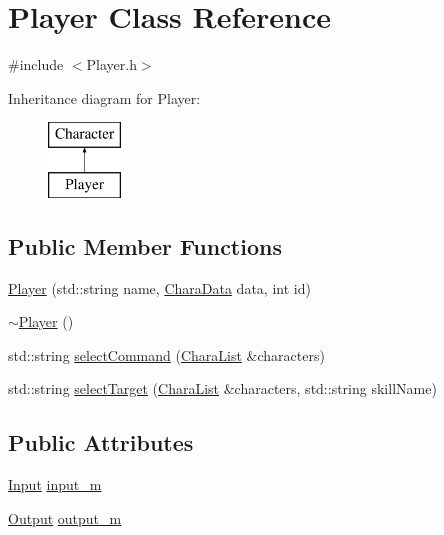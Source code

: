 \hypertarget{class_player}{}\section{Player Class Reference}
\label{class_player}


{\ttfamily \#include $<$Player.\+h$>$}

Inheritance diagram for Player\+:\begin{figure}[H]
\begin{center}
\leavevmode
\includegraphics[height=2.000000cm]{class_player}
\end{center}
\end{figure}
\subsection*{Public Member Functions}
\begin{DoxyCompactItemize}
\item 
\hyperlink{class_player_ac67c2c665f202dd5a8d69eb4b7c39901}{Player} (std\+::string name, \hyperlink{struct_chara_data}{Chara\+Data} data, int id)
\item 
\hyperlink{class_player_a749d2c00e1fe0f5c2746f7505a58c062}{$\sim$\+Player} ()
\item 
std\+::string \hyperlink{class_player_a2dbcfb38080a64dab3f9b721486ab38d}{select\+Command} (\hyperlink{_character_8h_ac22f543a628d2695d0297c399b0272d8}{Chara\+List} \&characters)
\item 
std\+::string \hyperlink{class_player_a38ca95dfba650f93b6dba8a531991f45}{select\+Target} (\hyperlink{_character_8h_ac22f543a628d2695d0297c399b0272d8}{Chara\+List} \&characters, std\+::string skill\+Name)
\end{DoxyCompactItemize}
\subsection*{Public Attributes}
\begin{DoxyCompactItemize}
\item 
\hyperlink{class_input}{Input} \hyperlink{class_player_a4bae22afb4120b858ee46790c8fb2594}{input\+\_\+m}
\item 
\hyperlink{class_output}{Output} \hyperlink{class_player_ad35830aa20e37f039bdcd6f381d54967}{output\+\_\+m}
\end{DoxyCompactItemize}

